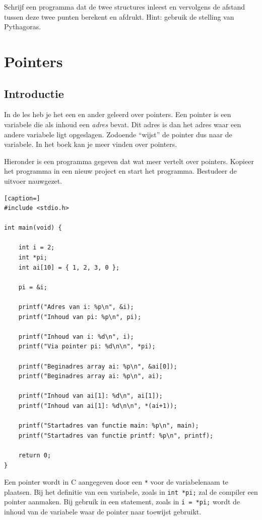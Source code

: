 \documentclass[a4paper,10pt,fleqn,twoside]{article}
\begin{document}
Schrijf een programma dat de twee structures inleest en vervolgens de afstand tussen deze twee punten berekent en afdrukt. Hint: gebruik de stelling van Pythagoras.


\clearpage
\section{Pointers}
\subsection{Introductie}
In de les heb je het een en ander geleerd over pointers. Een pointer is een variabele die als inhoud een \textsl{adres} bevat. Dit adres is dan het adres waar een andere variabele ligt opgeslagen. Zodoende ``wijst'' de pointer dus naar de variabele. In het boek kan je meer vinden over pointers.

Hieronder is een programma gegeven dat wat meer vertelt over pointers. Kopieer het programma in een nieuw project en start het programma. Bestudeer de uitvoer nauwgezet.

\begin{lstlisting}[caption=]
#include <stdio.h>

int main(void) {

    int i = 2;
    int *pi;
    int ai[10] = { 1, 2, 3, 0 };

    pi = &i;

    printf("Adres van i: %p\n", &i);
    printf("Inhoud van pi: %p\n", pi);

    printf("Inhoud van i: %d\n", i);
    printf("Via pointer pi: %d\n\n", *pi);

    printf("Beginadres array ai: %p\n", &ai[0]);
    printf("Beginadres array ai: %p\n", ai);

    printf("Inhoud van ai[1]: %d\n", ai[1]);
    printf("Inhoud van ai[1]: %d\n\n", *(ai+1));

    printf("Startadres van functie main: %p\n", main);
    printf("Startadres van functie printf: %p\n", printf);

    return 0;
}
\end{lstlisting}

Een pointer wordt in C aangegeven door een \lstinline|*| voor de variabelenaam te plaatsen. Bij het definitie van een variabele, zoals in \lstinline|int *pi;| zal de compiler een pointer aanmaken. Bij gebruik in een statement, zoals in \lstinline|i = *pi;| wordt de inhoud van de variabele waar de pointer naar toewijst gebruikt. 
\end{document}
